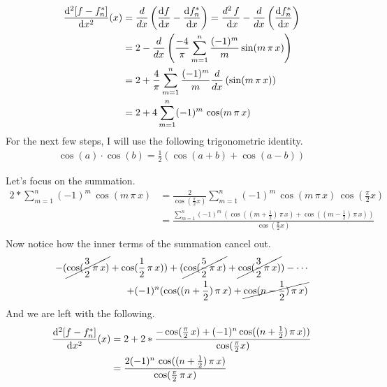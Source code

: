 \documentclass[12pt]{article}
\newcommand{\dx}{\; {\rm d}x}
\newcommand{\dbydx}[1]{\frac{d}{dx}\left( #1 \right)}
\newcommand{\dfdx}{\frac{{\rm d}f}{{\rm d}x}}
\newcommand{\dfstardx}{\frac{{\rm d}f_n^*}{{\rm d}x}}
\newcommand{\ddx}[2]{\frac{{\rm d}^#1#2}{{\rm d}x^#1}}
\begin{document}
\begin{equation}
	\begin{aligned}
		\ddx{2}{[f-f_{n}^*]}(x) &= \dbydx{\dfdx - \dfstardx} = \frac{d^2\,f}{\dx} - \dbydx{\dfstardx}\\
		&= 2 - \dbydx{\frac{-4}{\pi}\sum_{m=1}^n
			\frac{(-1)^m}{m} \sin(m\,\pi\,x)  }\\
		&= 2 + \frac{4}{\pi}\sum_{m=1}^n
			\frac{(-1)^m}{m} \dbydx{\sin(m\,\pi\,x)}\\
		&= 2 + 4\sum_{m=1}^n
			(-1)^m\, \cos(m\,\pi\,x)
	\end{aligned}
\end{equation}
For the next few steps, I will use the following trigonometric identity.
\begin{align}
	\cos(a) \cdot \cos(b) = \frac{1}{2} \left(\cos(a + b) + \cos(a - b) \right)
\end{align}

Let's focus on the summation.
\begin{equation}
	\begin{aligned}
		2 * \sum_{m=1}^n (-1)^m\, \cos(m\,\pi\,x)
			&= \frac{2}{\cos(\frac{\pi}{2}x)}\sum_{m=1}^n (-1)^m\, \cos(m\,\pi\,x)\, \cos(\frac{\pi}{2}x)\\
		&= \frac{\sum_{m=1}^n (-1)^m\, \left(\cos((m+\frac{1}{2})\,\pi\,x) +
						\cos((m-\frac{1}{2})\,\pi\,x)\right)}{\cos(\frac{\pi}{2}x)}\\
	\end{aligned}
\end{equation}
Now notice how the inner terms of the summation cancel out.
\begin{align}
	-(\cancel{\cos(\frac{3}{2}\,\pi\,x)} +  \cos(\frac{1}{2}\,\pi\,x))
	+ (\cancel{\cos(\frac{5}{2}\,\pi\,x)} + \cancel{\cos(\frac{3}{2}\,\pi\,x)})
	- \cdots\\
	+ (-1)^n(\cos((n + \frac{1}{2})\,\pi\,x) + \cancel{\cos(n - \frac{1}{2})\,\pi\,x)}
\end{align}
And we are left with the following.
\begin{equation}
	\begin{aligned}
		\ddx{2}{[f-f_{n}^*]}(x) &= 2 + 2 * \frac{-\cos(\frac{\pi}{2}\,x) + 
			(-1)^n \cos((n + \frac{1}{2})\,\pi\,x))}{\cos(\frac{\pi}{2}x)}\\
			&= \frac{2(-1)^n\,\cos((n+\frac{1}{2})\,\pi\,x)}{\cos(\frac{\pi}{2}\,\pi\,x)}\\
	\end{aligned}
\end{equation}\\
 
\end{document}
